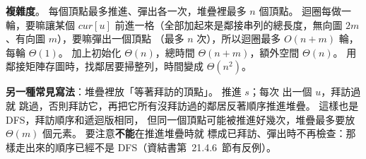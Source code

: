 \begin{pastsoln}
\textbf{複雜度}。 每個頂點最多推進、彈出各一次，堆疊裡最多 $n$ 個頂點。 迴圈每做一輪，要嘛讓某個
$\mathit{cur}[u]$ 前進一格（全部加起來是鄰接串列的總長度，無向圖 $2m$、有向圖 $m$），要嘛彈出一個頂點
（最多 $n$ 次），所以迴圈最多 $O(n + m)$ 輪，每輪 $\Theta(1)$。 加上初始化 $\Theta(n)$，總時間
$\Theta(n + m)$，額外空間 $\Theta(n)$。 用鄰接矩陣存圖時，找鄰居要掃整列，時間變成 $\Theta(n^2)$。

\textbf{另一種常見寫法}：堆疊裡放「等著拜訪的頂點」。 推進 $s$；每次  出一個 $u$，拜訪過就
跳過，否則拜訪它，再把它所有沒拜訪過的鄰居反著順序推進堆疊。 這樣也是 DFS，拜訪順序和遞迴版相同，
但同一個頂點可能被推進好幾次，堆疊最多要放 $\Theta(m)$ 個元素。 要注意\textbf{不能}在推進堆疊時就
標成已拜訪、彈出時不再檢查：那樣走出來的順序已經不是 DFS（資結書第~21.4.6~節有反例）。
\end{pastsoln}
